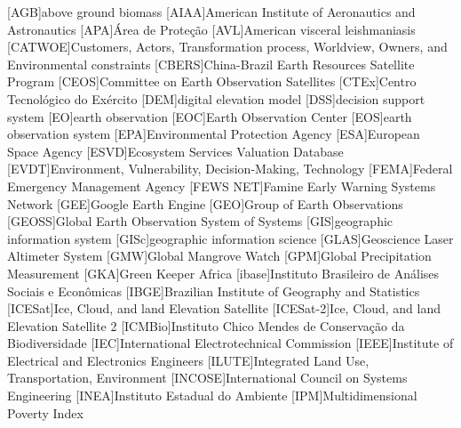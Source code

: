 \begin{acronym}[HyperLEAVES] \itemsep0pt \setlength{\parskip}{0pt}
[AGB]{above ground biomass}
[AIAA]{American Institute of Aeronautics and Astronautics}
[APA]{Área de Proteção}
[AVL]{American visceral leishmaniasis}
[CATWOE]{Customers, Actors, Transformation process, Worldview, Owners, and Environmental constraints}
[CBERS]{China-Brazil Earth Resources Satellite Program}
[CEOS]{Committee on Earth Observation Satellites}
[CTEx]{Centro Tecnológico do Exército}
[DEM]{digital elevation model}
[DSS]{decision support system}
[EO]{earth observation}
[EOC]{Earth Observation Center}
[EOS]{earth observation system}
[EPA]{Environmental Protection Agency}
[ESA]{European Space Agency}
[ESVD]{Ecosystem Services Valuation Database}
[EVDT]{Environment, Vulnerability, Decision-Making, Technology}
[FEMA]{Federal Emergency Management Agency}
[FEWS NET]{Famine Early Warning Systems Network}
[GEE]{Google Earth Engine}
[GEO]{Group of Earth Observations}
[GEOSS]{Global Earth Observation System of Systems}
[GIS]{geographic information system}
[GISc]{geographic information science}
[GLAS]{Geoscience Laser Altimeter System}
[GMW]{Global Mangrove Watch}
[GPM]{Global Precipitation Measurement}
[GKA]{Green Keeper Africa}
[ibase]{Instituto Brasileiro de Análises Sociais e Econômicas}
[IBGE]{Brazilian Institute of Geography and Statistics}
[ICESat]{Ice, Cloud, and land Elevation Satellite}
[ICESat-2]{Ice, Cloud, and land Elevation Satellite 2}
[ICMBio]{Instituto Chico Mendes de Conservação da Biodiversidade}
[IEC]{International Electrotechnical Commission}
[IEEE]{Institute of Electrical and Electronics Engineers}
[ILUTE]{Integrated Land Use, Transportation, Environment}
[INCOSE]{International Council on Systems Engineering}
[INEA]{Instituto Estadual do Ambiente}
[IPM]{Multidimensional Poverty Index}

\end{acronym}
